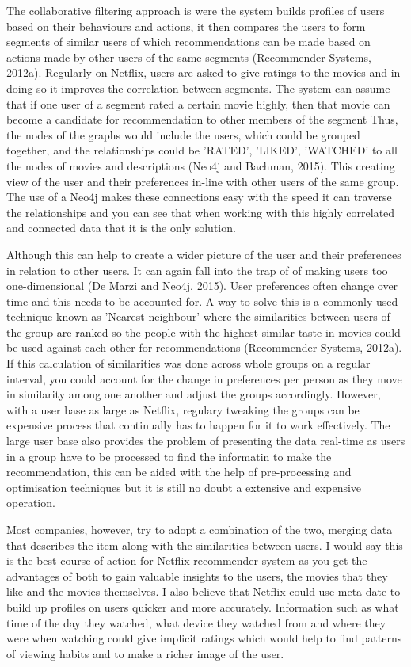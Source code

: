 \documentclass[a4paper]{article}
\begin{document}
The collaborative filtering approach is were the system builds profiles of users based on their behaviours and actions, it then compares the users to form segments of similar users of which recommendations can be made based on actions made by other users of the same segments (Recommender-Systems, 2012a). Regularly on Netflix, users are asked to give ratings to the movies and in doing so it improves the correlation between segments. The system can assume that if one user of a segment rated a certain movie highly, then that movie can become a candidate for recommendation to other members of the segment Thus, the nodes of the graphs would include the users, which could be grouped together, and the relationships could be 'RATED', 'LIKED', 'WATCHED' to all the nodes of movies and descriptions (Neo4j and Bachman, 2015). This creating view of the user and their preferences in-line with other users of the same group. The use of a Neo4j makes these connections easy with the speed it can traverse the relationships and you can see that when working with this highly correlated and connected data that it is the only solution. \par

Although this can help to create a wider picture of the user and their preferences in relation to other users. It can again fall into the trap of of making users too one-dimensional (De Marzi and Neo4j, 2015). User preferences often change over time and this needs to be accounted for. A way to solve this is a commonly used technique known as 'Nearest neighbour' where the similarities between users of the group are ranked so the people with the highest similar taste in movies could be used against each other for recommendations (Recommender-Systems, 2012a). If this calculation of similarities was done across whole groups on a regular interval, you could account for the change in preferences per person as they move in similarity among one another and adjust the groups accordingly. However, with a user base as large as Netflix, regulary tweaking the groups can be expensive process that continually has to happen for it to work effectively. The large user base also provides the problem of presenting the data real-time as users in a group have to be processed to find the informatin to make the recommendation, this can be aided with the help of pre-processing and optimisation techniques but it is still no doubt a extensive and expensive operation.

Most companies, however, try to adopt a combination of the two, merging data that describes the item along with the similarities between users. I would say this is the best course of action for Netflix recommender system as you get the advantages of both to gain valuable insights to the users, the movies that they like and the movies themselves. I also believe that Netflix could use meta-date to build up profiles on users quicker and more accurately. Information such as what time of the day they watched, what device they watched from and where they were when watching could give implicit ratings which would help to find patterns of viewing habits and to make a richer image of the user. \par
\end{document}
